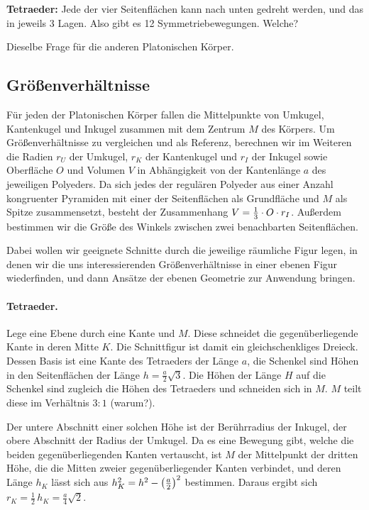 \documentclass[11pt]{article}
\begin{document}
\textbf{Tetraeder:} Jede der vier Seitenflächen kann nach unten gedreht
werden, und das in jeweils 3 Lagen. Also gibt es 12 Symmetriebewegungen.
Welche?

Dieselbe Frage für die anderen Platonischen Körper.

\subsection*{Größenverhältnisse}

Für jeden der Platonischen Körper fallen die Mittelpunkte von Umkugel,
Kantenkugel und Inkugel zusammen mit dem Zentrum $M$ des Körpers.  Um
Größenverhältnisse zu vergleichen und als Referenz, berechnen wir im Weiteren
die Radien $r_U$ der Umkugel, $r_K$ der Kantenkugel und $r_I$ der Inkugel
sowie Oberfläche $O$ und Volumen $V$ in Abhängigkeit von der Kantenlänge $a$
des jeweiligen Polyeders.  Da sich jedes der regulären Polyeder aus einer
Anzahl kongruenter Pyramiden mit einer der Seitenflächen als Grundfläche und
$M$ als Spitze zusammensetzt, besteht der Zusammenhang $V=\frac13\cdot O\cdot r_I$.
Außerdem bestimmen wir die Größe des Winkels zwischen zwei benachbarten
Seitenflächen.

Dabei wollen wir geeignete Schnitte durch die jeweilige räumliche Figur legen,
in denen wir die uns interessierenden Größenverhältnisse in einer ebenen Figur
wiederfinden, und dann Ansätze der ebenen Geometrie zur Anwendung bringen.
  
\paragraph{Tetraeder.}
Lege eine Ebene durch eine Kante und $M$. Diese schneidet die
gegenüberliegende Kante in deren Mitte $K$. Die Schnittfigur ist damit ein
gleichschenkliges Dreieck. Dessen Basis ist eine Kante des Tetraeders der
Länge $a$, die Schenkel sind Höhen in den Seitenflächen der Länge
$h=\frac{a}{2}\sqrt{3}$.  Die Höhen der Länge $H$ auf die Schenkel sind
zugleich die Höhen des Tetraeders und schneiden sich in $M$.  $M$ teilt diese
im Verhältnis $3:1$ (warum?). 

Der untere Abschnitt einer solchen Höhe ist der Berührradius der Inkugel, der
obere Abschnitt der Radius der Umkugel.  Da es eine Bewegung gibt, welche die
beiden gegenüberliegenden Kanten vertauscht, ist $M$ der Mittelpunkt der
dritten Höhe, die die Mitten zweier gegenüberliegender Kanten verbindet, und
deren Länge $h_K$ lässt sich aus $h_K^2=h^2-\left(\frac{a}{2}\right)^2$ bestimmen.
Daraus ergibt sich $r_K=\frac12\,h_K=\frac{a}{4}\sqrt{2}$.
\end{document}

